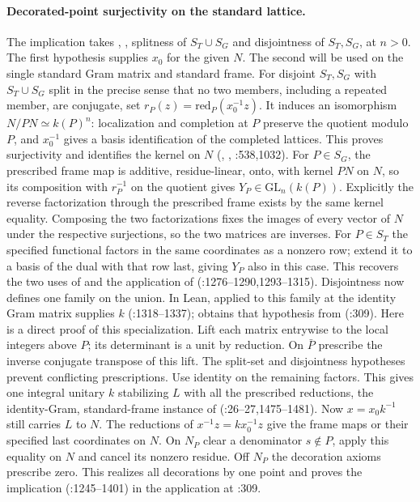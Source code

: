 \paragraph{Decorated-point surjectivity on the standard lattice.}
The implication  takes
, , splitness of $S_T\cup S_G$ and
disjointness of $S_T,S_G$, at $n>0$. The first hypothesis supplies
$x_0$ for the given $N$. The second will be used on the single standard
Gram matrix and standard frame.
For disjoint $S_T,S_G$ with $S_T\cup S_G$ split in the precise sense
that no two members, including a repeated member, are conjugate,
set $r_P(z)=\mathrm{red}_P(x_0^{-1}z)$. It induces an isomorphism
$N/PN\simeq k(P)^n$: localization and completion at $P$ preserve
the quotient modulo $P$, and $x_0^{-1}$ gives a basis identification
of the completed lattices. This proves surjectivity and identifies
the kernel on $N$ (, ,
:538,1032). For $P\in S_G$,
the prescribed frame map is additive, residue-linear, onto, with kernel
$PN$ on $N$, so its composition with $r_P^{-1}$ on the quotient gives
$Y_P\in\mathrm{GL}_n(k(P))$. Explicitly the reverse factorization
through the prescribed frame exists by the same kernel equality.
Composing the two factorizations fixes the images of every vector of
$N$ under the respective surjections, so the two matrices are inverses.
For $P\in S_T$ the specified functional
factors in the same coordinates as a nonzero row; extend it to a basis
of the dual with that row last, giving $Y_P$ also in this case.
This recovers the two uses of  and the application
of  (:1276--1290,1293--1315).
Disjointness now defines one family on the union. In Lean, 
applied to this family at the identity Gram matrix supplies $k$
(:1318--1337);
 obtains that hypothesis from
 (:309).
Here is a direct proof of this specialization. Lift each
matrix entrywise to the local integers above $P$; its determinant is a
unit by reduction. On $\bar P$ prescribe the inverse conjugate transpose
of this lift. The split-set and disjointness hypotheses prevent conflicting
prescriptions. Use identity on the remaining factors. This gives one
integral unitary $k$ stabilizing $L$ with all the prescribed reductions,
the identity-Gram, standard-frame instance of 
(:26--27,1475--1481).
Now $x=x_0 k^{-1}$ still carries $L$ to $N$. The reductions of
$x^{-1}z=kx_0^{-1}z$ give the frame maps or their specified last
coordinates on $N$. On $N_P$ clear a denominator $s\notin P$, apply
this equality on $N$ and cancel its nonzero residue. Off $N_P$ the
decoration axioms prescribe zero. This realizes all decorations by one
point and proves the implication 
(:1245--1401) in the application at
:309.

